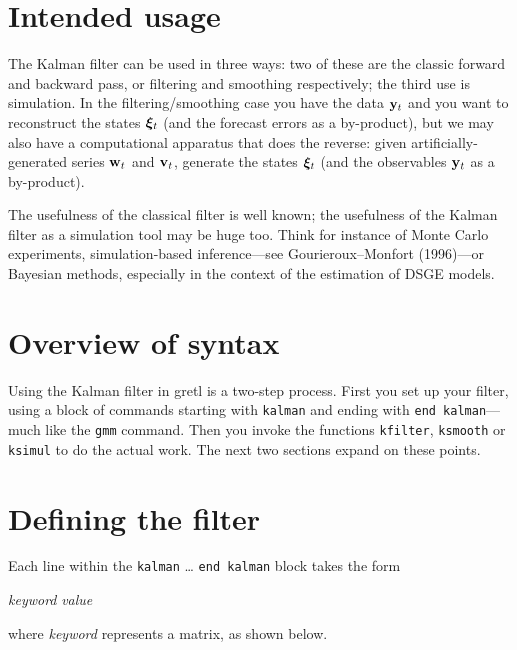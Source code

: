 \documentclass[a4paper]{article}
\newcommand{\obsvec}{\ensuremath\mathbf{y}}
\newcommand{\obsdist}{\ensuremath\mathbf{w}}
\newcommand{\statevec}{\ensuremath\mathbf{\bm \xi}}
\newcommand{\strdist}{\ensuremath\mathbf{v}}
\begin{document}
\section{Intended usage}

The Kalman filter can be used in three ways: two of these are the
classic forward and backward pass, or filtering and smoothing
respectively; the third use is simulation.  In the
filtering/smoothing case you have the data $\obsvec_t$ and you want to
reconstruct the states $\statevec_t$ (and the forecast errors as a
by-product), but we may also have a computational apparatus that does
the reverse: given artificially-generated series $\obsdist_t$ and
$\strdist_t$, generate the states $\statevec_t$ (and the observables
$\obsvec_t$ as a by-product).

The usefulness of the classical filter is well known; the usefulness
of the Kalman filter as a simulation tool may be huge too. Think for
instance of Monte Carlo experiments, simulation-based inference---see
Gourieroux--Monfort (1996)---or Bayesian methods, especially in the
context of the estimation of DSGE models.

\section{Overview of syntax}

Using the Kalman filter in gretl is a two-step process.  First you set
up your filter, using a block of commands starting with
\texttt{kalman} and ending with \texttt{end kalman}---much like the
\texttt{gmm} command.  Then you invoke the functions \texttt{kfilter},
\texttt{ksmooth} or \texttt{ksimul} to do the actual work.  The next
two sections expand on these points.

\section{Defining the filter}

Each line within the \texttt{kalman} \dots{} \texttt{end kalman} block 
takes the form

\vspace{1ex}
\textsl{keyword} \textsl{value}
\vspace{1ex}

\noindent where \textsl{keyword} represents a matrix, as shown 
below.
\end{document}
